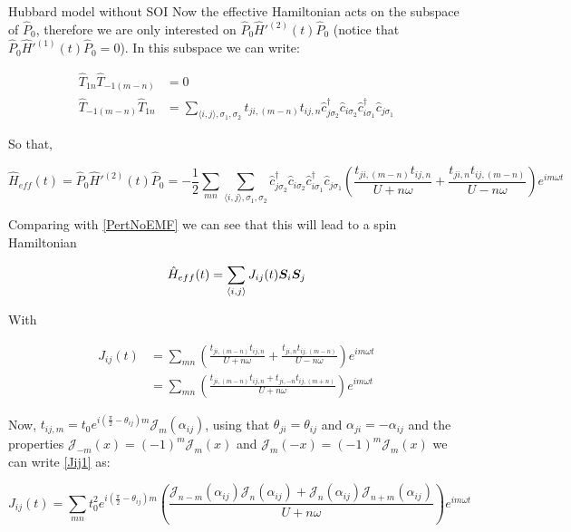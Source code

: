 \begin{section}{Hubbard model without SOI}
Now the effective Hamiltonian acts on the subspace of $\hat{P}_0$, therefore we are only interested on $\hat{P}_0 \hat{H}'^{(2)}(t) \hat{P}_0$ (notice that $\hat{P}_0 \hat{H}'^{(1)}(t) \hat{P}_0 = 0$). In this subspace we can write:

\begin{align*}
\hat{T}_{1n} \hat{T}_{-1(m-n)} &= 0 \\
\hat{T}_{-1(m-n)} \hat{T}_{1n} &= \sum_{\langle i,j \rangle, \sigma_1, \sigma_2} t_{ji,(m-n)} t_{ij,n} \hat{c}_{j \sigma_2}^\dagger \hat{c}_{i \sigma_2} \hat{c}_{i \sigma_1}^\dagger \hat{c}_{j \sigma_1}
\end{align*}

So that,

\begin{equation}
\hat{H}_{eff}(t) = \hat{P}_0\hat{H}'^{(2)}(t)\hat{P}_0 = - \frac{1}{2}\sum_{mn} \sum_{\langle i,j \rangle, \sigma_1, \sigma_2}\hat{c}_{j \sigma_2}^\dagger \hat{c}_{i \sigma_2} \hat{c}_{i \sigma_1}^\dagger \hat{c}_{j \sigma_1} \left( \frac{t_{ji,(m-n)} t_{ij,n}}{U+n\omega} + \frac{t_{ji,n} t_{ij,(m-n)}}{U-n\omega} \right) e^{im\omega t}
\end{equation}

Comparing with \ref{PertNoEMF} we can see that this will lead to a spin Hamiltonian 

\begin{equation}
\hat{H}_{eff}(t) = \sum_{\langle i,j \rangle} J_{ij}(t) \boldsymbol{S}_i \boldsymbol{S}_j
\end{equation}

With 

\begin{align}
J_{ij}(t) &= \sum_{mn} \left( \frac{t_{ji,(m-n)} t_{ij,n}}{U+n\omega} + \frac{t_{ji,n} t_{ij,(m-n)}}{U-n\omega} \right) e^{im\omega t} \nonumber \\
&= \sum_{mn} \left( \frac{t_{ji,(m-n)} t_{ij,n} + t_{ji,-n} t_{ij,(m+n)}}{U+n\omega} \right) e^{im\omega t} \label{Jij1}
\end{align}

Now, $t_{ij,m} = t_0 e^{i(\frac{\pi}{2}-\theta_{ij})m} \mathcal{J}_m(\alpha_{ij})$, using that $\theta_{ji} = \theta_{ij}$ and $\alpha_{ji} = -\alpha_{ij}$ and the properties $\mathcal{J}_{-m}(x) = (-1)^m\mathcal{J}_m(x)$ and $\mathcal{J}_m(-x) = (-1)^m\mathcal{J}_m(x)$ we can write \ref{Jij1} as:

\begin{equation}
J_{ij}(t) = \sum_{mn} t_0^2 e^{i(\frac{\pi}{2}-\theta_{ij})m}\left(\frac{\mathcal{J}_{n-m}(\alpha_{ij})\mathcal{J}_{n}(\alpha_{ij})+\mathcal{J}_{n}(\alpha_{ij})\mathcal{J}_{n+m}(\alpha_{ij})}{U+n\omega} \right) e^{im\omega t}
\end{equation}


\end{section}
